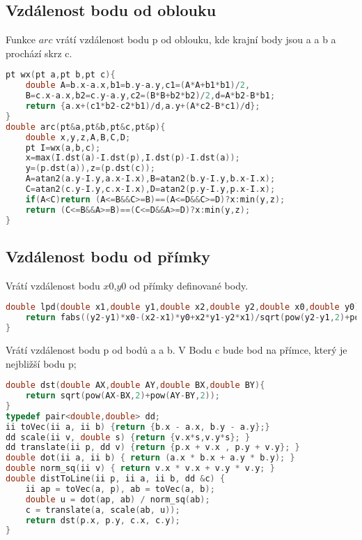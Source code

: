 \documentclass[11pt]{article}
\begin{document}
\subsection{Vzdálenost bodu od oblouku}
Funkce $arc$ vrátí vzdálenost bodu \textsf{p} od oblouku, kde krajní body jsou \textsf{a} a \textsf{b} a prochází skrz \textsf{c}.
\begin{lstlisting}[language=C++]
pt wx(pt a,pt b,pt c){
    double A=b.x-a.x,b1=b.y-a.y,c1=(A*A+b1*b1)/2,
    B=c.x-a.x,b2=c.y-a.y,c2=(B*B+b2*b2)/2,d=A*b2-B*b1;
    return {a.x+(c1*b2-c2*b1)/d,a.y+(A*c2-B*c1)/d};
}
double arc(pt&a,pt&b,pt&c,pt&p){
    double x,y,z,A,B,C,D;
    pt I=wx(a,b,c);
    x=max(I.dst(a)-I.dst(p),I.dst(p)-I.dst(a));
    y=(p.dst(a)),z=(p.dst(c));
    A=atan2(a.y-I.y,a.x-I.x),B=atan2(b.y-I.y,b.x-I.x);
    C=atan2(c.y-I.y,c.x-I.x),D=atan2(p.y-I.y,p.x-I.x);
    if(A<C)return (A<=B&&C>=B)==(A<=D&&C>=D)?x:min(y,z);
    return (C<=B&&A>=B)==(C<=D&&A>=D)?x:min(y,z);
}
\end{lstlisting}
\subsection{Vzdálenost bodu od přímky}
Vrátí vzdálenost bodu $x0$,$y0$ od přímky definované body.
\begin{lstlisting}[language=C++]
double lpd(double x1,double y1,double x2,double y2,double x0,double y0){
    return fabs((y2-y1)*x0-(x2-x1)*y0+x2*y1-y2*x1)/sqrt(pow(y2-y1,2)+pow(x2-x1,2));
}
\end{lstlisting}
Vrátí vzdálenost bodu \textsf{p} od bodů \textsf{a} a \textsf{b}. V Bodu \textsf{c} bude bod na přímce, který je nejbližší bodu \textsf{p};
\begin{lstlisting}[language=C++]
double dst(double AX,double AY,double BX,double BY){
    return sqrt(pow(AX-BX,2)+pow(AY-BY,2));
}
typedef pair<double,double> dd;
ii toVec(ii a, ii b) {return {b.x - a.x, b.y - a.y};}
dd scale(ii v, double s) {return {v.x*s,v.y*s}; }
dd translate(ii p, dd v) {return {p.x + v.x , p.y + v.y}; }
double dot(ii a, ii b) { return (a.x * b.x + a.y * b.y); }
double norm_sq(ii v) { return v.x * v.x + v.y * v.y; }
double distToLine(ii p, ii a, ii b, dd &c) {
    ii ap = toVec(a, p), ab = toVec(a, b);
    double u = dot(ap, ab) / norm_sq(ab);
    c = translate(a, scale(ab, u));
    return dst(p.x, p.y, c.x, c.y);
}
\end{lstlisting}
\end{document}
